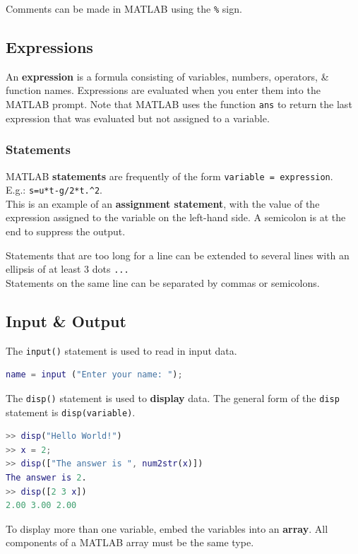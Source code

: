\documentclass[11pt]{article}
\begin{document}
Comments can be made in MATLAB using the \verb|%| sign. 

\subsection{Expressions}
An \textbf{expression} is a formula consisting of variables, numbers, operators, \& function names. 
Expressions are evaluated when you enter them into the MATLAB prompt. 
Note that MATLAB uses the function \verb|ans| to return the last expression that was evaluated but not assigned
to a variable. 

\subsubsection{Statements}
MATLAB \textbf{statements} are frequently of the form \verb|variable = expression|. \\
E.g.: \verb|s=u*t-g/2*t.^2|. 
\\
This is an example of an \textbf{assignment statement}, with the value of the expression assigned to the 
variable on the left-hand side.
A semicolon is at the end to suppress the output. 

Statements that are too long for a line can be extended to several lines with an ellipsis of at least 3 dots \verb|...|
\\
Statements on the same line can be separated by commas or semicolons.

\newpage

\subsection{Input \& Output}
The \verb|input()| statement is used to read in input data. 
\begin{lstlisting}[language=MATLAB]
name = input ("Enter your name: ");
\end{lstlisting}

The \verb|disp()| statement is used to \textbf{display} data. 
The general form of the \verb|disp| statement is \verb|disp(variable)|. 

\begin{lstlisting}[language=MATLAB]
>> disp("Hello World!")
>> x = 2;
>> disp(["The answer is ", num2str(x)])
The answer is 2. 
>> disp([2 3 x])
2.00 3.00 2.00
\end{lstlisting}

To display more than one variable, embed the variables into an \textbf{array}. 
All components of a MATLAB array must be the same type.
\end{document}
